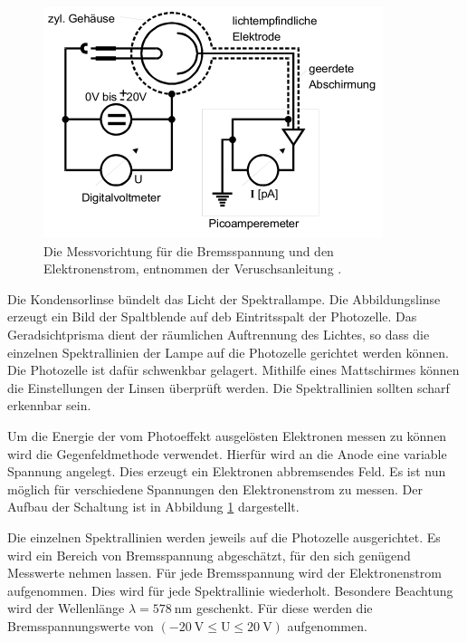   \begin{figure}
    \centering
    \includegraphics[width=0.7\linewidth]{images/Messung.png}
    \caption{Die Messvorichtung für die Bremsspannung und den Elektronenstrom, entnommen der Veruschsanleitung \cite[76]{sample}.}
    \label{fig:Messung}
  \end{figure}

Die Kondensorlinse bündelt das Licht der Spektrallampe.
Die Abbildungslinse erzeugt ein Bild der Spaltblende auf deb Eintritsspalt der Photozelle.
Das Geradsichtprisma dient der räumlichen Auftrennung des Lichtes, so dass die einzelnen Spektrallinien der Lampe auf die Photozelle gerichtet werden können.
Die Photozelle ist dafür schwenkbar gelagert.
Mithilfe eines Mattschirmes können die Einstellungen der Linsen überprüft werden.
Die Spektrallinien sollten scharf erkennbar sein.

Um die Energie der vom Photoeffekt ausgelösten Elektronen messen zu können wird die Gegenfeldmethode verwendet.
Hierfür wird an die Anode eine variable Spannung angelegt.
Dies erzeugt ein Elektronen abbremsendes Feld.
Es ist nun möglich für verschiedene Spannungen den Elektronenstrom zu messen.
Der Aufbau der Schaltung ist in Abbildung \ref{fig:Messung} dargestellt.

Die einzelnen Spektrallinien werden jeweils auf die Photozelle ausgerichtet.
Es wird ein Bereich von Bremsspannung abgeschätzt, für den sich genügend Messwerte nehmen lassen.
Für jede Bremsspannung wird der Elektronenstrom aufgenommen.
Dies wird für jede Spektrallinie wiederholt.
Besondere Beachtung wird der Wellenlänge $\lambda = \SI{578}{\nano\metre}$ geschenkt.
Für diese werden die Bremsspannungswerte von $ (\SI{-20}{\volt} \leq \text{U} \leq \SI{+20}{\volt})$ aufgenommen.
